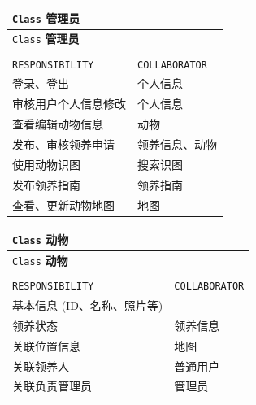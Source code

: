 \documentclass[12pt,a4paper,UTF8]{article}
\begin{document}
\vspace{1cm}

\begin{xltabular}{\linewidth}{|>{\raggedright\arraybackslash}p{8cm}|>{\raggedright\arraybackslash}p{4cm}|}
  \hline
  \verb|Class| \textbf{管理员} &  \\ \hline \endfirsthead
  \hline
  \verb|Class| \textbf{管理员} &  \\ \hline \endhead
  \hline
   \\ \endfoot
  \hline \endlastfoot

  \verb|RESPONSIBILITY| & \verb|COLLABORATOR| \\ \hline
  登录、登出 & 个人信息 \\ \hline
  审核用户个人信息修改 & 个人信息 \\ \hline
  查看编辑动物信息 & 动物 \\ \hline
  发布、审核领养申请 & 领养信息、动物 \\ \hline
  使用动物识图 & 搜索识图 \\ \hline
  发布领养指南 & 领养指南 \\ \hline
  查看、更新动物地图 & 地图 \\ \hline
\end{xltabular}

\vspace{1cm}

\begin{xltabular}{\linewidth}{|>{\raggedright\arraybackslash}p{8cm}|>{\raggedright\arraybackslash}p{4cm}|}
  \hline
  \verb|Class| \textbf{动物} &  \\ \hline \endfirsthead
  \hline
  \verb|Class| \textbf{动物} &  \\ \hline \endhead
  \hline
   \\ \endfoot
  \hline \endlastfoot

  \verb|RESPONSIBILITY| & \verb|COLLABORATOR| \\ \hline
  基本信息 (ID、名称、照片等) &  \\ \hline
  领养状态 & 领养信息 \\ \hline
  关联位置信息 & 地图 \\ \hline
  关联领养人 & 普通用户 \\ \hline
  关联负责管理员 & 管理员 \\ \hline
\end{xltabular}

\vspace{1cm}
\end{document}

